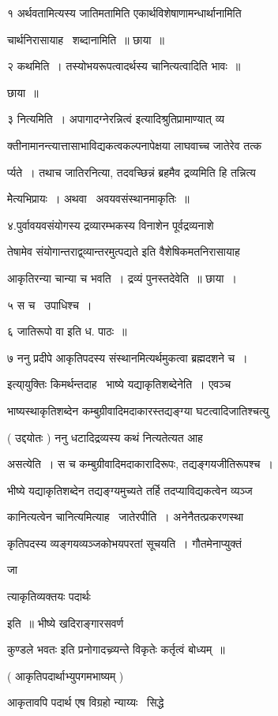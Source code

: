 \documentclass[11pt, openany]{book}
\begin{document}
१ अर्थवतामित्यस्य जातिमतामिति एकार्थविशेषाणामन्धार्थानामिति 

चार्थनिरासायाह \textendash\ शब्दानामिति~॥ छाया~॥ 

२ कथमिति~। तस्योभयरूपत्वादर्थस्य चानित्यत्वादिति भावः~॥ 

छाया~॥ 

३ नित्यमिति~। अपागादग्नेरन्नित्वं इत्यादिश्रुतिप्रामाण्यात् व्य \textendash\ 

क्तीनामानन्त्यात्तासाभाविद्यकत्वकल्पनापेक्षया लाघवाच्च जातेरेव तत्क \textendash\ 

र्प्यते~। तथाच जातिरनित्या, तदवच्छिन्नं ब्रहमैव द्रव्यमिति हि तन्नित्य \textendash\ 


मेेत्यभिप्रायः~। अथवा \textendash\ अवयवसंस्थानमाकृतिः~॥ 

४.पुर्वावयवसंयोगस्य द्रव्यारम्भकस्य विनाशेन पूर्वद्रव्यनाशे 

तेषामेव संयोगान्तराद्व्व्यान्तरमुत्पद्यते इति वैशेषिकमतनिरासायाह \textendash\ 

आकृतिरन्या चान्या च भवति~। द्रव्यं पुनस्तदेवेति~॥ छाया~। 

५ स च \textendash\ उपाधिश्च~। 

६ {\qt जातिरूपो वा} इति ध. पाठः~॥ 

७ ननु प्रदीपे आकृतिपदस्य संस्थानमित्यर्थमुकत्वा ब्रह्मदशने च~। 

इत्या्युक्तिः किमर्थन्तदाह \textendash\ भाष्ये यद्याकृतिशब्देनेति~। एवञ्च 

भाष्यस्थाकृतिशब्देन कम्बुग्रीवादिमदाकारस्तद्यङ्ग्या
घटत्वादिजातिश्चत्यु \textendash\ 





( उद्दयोतः ) ननु धटादिद्रव्यस्य कथं नित्यतेत्यत आह \textendash\ 

 असत्येति~। स च कम्बुग्रीवादिमदाकारादिरूपः, तद्यङ्गयजीतिरूपश्च~। 

भीष्ये यद्याकृतिशब्देन तद्यङ्ग्यमुच्यते तर्हि तदप्याविद्यकत्वेन व्यञ्ज \textendash\ 


कानित्यत्वेन चानित्यमित्याह \textendash\ जातेरपीति~। अनेनैतत्प्रकरणस्था \textendash\ 

कृतिपदस्य व्यङ्गयव्यञ्जकोभयपरतां सूचयति~। गौतमेनाप्युक्तं {\qt जा \textendash\ 

त्याकृतिव्यक्तयः पदार्थः} इति~॥ भीष्ये खदिराङ्गारसवर्ण 

कुण्डले भवतः इति प्रनोगादच्व्र्यन्ते विकृतेः कर्तृत्वं बोध्यम्~॥ 

( आकृतिपदार्थाभ्युपगमभाष्यम् ) 

आकृतावपि पदार्थ एष विग्रहो न्याय्यः \textendash\ सिद्धे 
\end{document}
